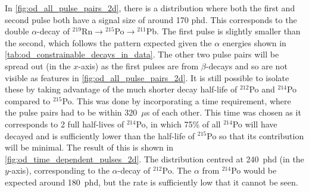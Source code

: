 

\par
In \autoref{fig:od_all_pulse_pairs_2d}, there is a distribution where both the first and second pulse both have a signal size of around 170 phd.
This corresponds to the double $\alpha$-decay of ${}^{219}$Rn$\to{}^{215}$Po$\to{}^{211}$Pb.
The first pulse is slightly smaller than the second, which follows the pattern expected given the $\alpha$ energies shown in \autoref{tab:od_constrainable_decays_in_data}.
The other two pulse pairs will be spread out (in the $x$-axis) as the first pulses are from $\beta$-decays and so are not visible as features in \autoref{fig:od_all_pulse_pairs_2d}.
It is still possible to isolate these by taking advantage of the much shorter decay half-life of ${}^{212}$Po and ${}^{214}$Po compared to ${}^{215}$Po.
This was done by incorporating a time requirement, where the pulse pairs had to be within 320~$\mu$s of each other.
This time was chosen as it corresponds to 2 full half-lives of ${}^{214}$Po, in which 75\% of all ${}^{214}$Po will have decayed and is sufficiently lower than the half-life of ${}^{215}$Po so that its contribution will be minimal.
The result of this is shown in \autoref{fig:od_time_dependent_pulses_2d}.
The distribution centred at 240~phd (in the $y$-axis), corresponding to the $\alpha$-decay of ${}^{212}$Po.
The $\alpha$ from ${}^{214}$Po would be expected around 180~phd, but the rate is sufficiently low that it cannot be seen.

